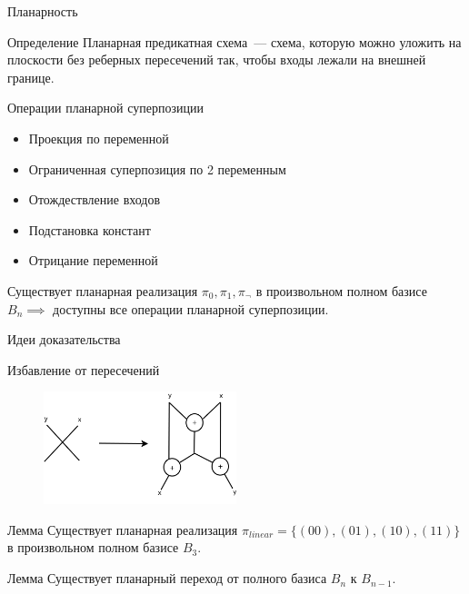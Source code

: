 \documentclass{beamer}
\begin{document}
\begin{frame}{Планарность}
    \begin{block}{Определение}
        Планарная предикатная схема~--- схема, которую можно уложить на плоскости без реберных пересечений 
        так, чтобы входы лежали на внешней границе. 
    \end{block}

    \begin{block}{Операции планарной суперпозиции}
        \begin{itemize}
            \item Проекция по переменной
            \item Ограниченная суперпозиция по 2 переменным
            \item Отождествление входов
            \item Подстановка констант
            \item Отрицание переменной
        \end{itemize}
    \end{block}

    \begin{block}{}
    Существует планарная реализация $\pi_0, \pi_1, \pi_{\neg}$ в произвольном полном базисе $B_n \implies$ доступны
    все операции планарной суперпозиции.
    \end{block}
\end{frame}

\begin{frame}{Идеи доказательства}
    \begin{block}{Избавление от пересечений}
        \begin{figure}[htb]
        \centering
        \includegraphics[width=0.5\textwidth]{intersection.png}
        \label{fig:xor}
        \end{figure}
    \end{block}
    \begin{block}{Лемма} 
    Существует планарная реализация $\pi_{linear} = \{(00), (01), (10), (11)\}$ в произвольном полном базисе $B_3$.
    \end{block}
    \begin{block}{Лемма} 
    Существует планарный переход от полного базиса $B_n$ к $B_{n-1}$.
    \end{block}
\end{frame}
\end{document}
